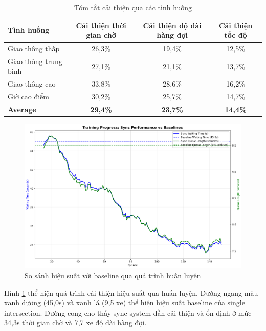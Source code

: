 \begin{table}[!htp]
    \centering
    \caption{Tóm tắt cải thiện qua các tình huống}
    \label{tab:sync_scenarios_summary}
    \begin{tabular}{@{}lccc@{}}
        \toprule \textbf{Tình huống} & \textbf{Cải thiện thời gian chờ} & \textbf{Cải thiện độ dài hàng đợi} & \textbf{Cải thiện tốc độ} \\
        \midrule 
        Giao thông thấp & 26,3\% & 19,4\% & 12,5\% \\
        Giao thông trung bình & 27,1\% & 21,1\% & 13,7\% \\
        Giao thông cao & 33,8\% & 28,6\% & 16,2\% \\
        Giờ cao điểm & 30,2\% & 25,7\% & 14,7\% \\
        \midrule
        \textbf{Average} & \textbf{29,4\%} & \textbf{23,7\%} & \textbf{14,4\%} \\
        \bottomrule
    \end{tabular}
\end{table}

\begin{figure}[!htp]
    \centering
    \includegraphics[width=\textwidth]{figures/training_with_baselines.png}
    \caption{So sánh hiệu suất với baseline qua quá trình huấn luyện}
    \label{fig:training_with_baselines}
\end{figure}

Hình \ref{fig:training_with_baselines} thể hiện quá trình cải thiện hiệu suất qua huấn luyện. Đường ngang màu xanh dương (45,0s) và xanh lá (9,5 xe) thể hiện hiệu suất baseline của single intersection. Đường cong cho thấy sync system dần cải thiện và ổn định ở mức 34,3s thời gian chờ và 7,7 xe độ dài hàng đợi.

